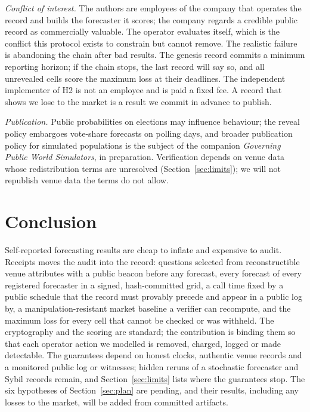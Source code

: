 \documentclass[11pt]{article}
\begin{document}
\emph{Conflict of interest.} The authors are employees of the company that operates the record and builds the forecaster it scores; the company regards a credible public record as commercially valuable. The operator evaluates itself, which is the conflict this protocol exists to constrain but cannot remove. The realistic failure is abandoning the chain after bad results. The genesis record commits a minimum reporting horizon; if the chain stops, the last record will say so, and all unrevealed cells score the maximum loss at their deadlines. The independent implementer of H2 is not an employee and is paid a fixed fee. A record that shows we lose to the market is a result we commit in advance to publish.

\emph{Publication.} Public probabilities on elections may influence behaviour; the reveal policy embargoes vote-share forecasts on polling days, and broader publication policy for simulated populations is the subject of the companion \emph{Governing Public World Simulators}, in preparation. Verification depends on venue data whose redistribution terms are unresolved (Section~\ref{sec:limits}); we will not republish venue data the terms do not allow.

\section{Conclusion}

Self-reported forecasting results are cheap to inflate and expensive to audit. Receipts moves the audit into the record: questions selected from reconstructible venue attributes with a public beacon before any forecast, every forecast of every registered forecaster in a signed, hash-committed grid, a call time fixed by a public schedule that the record must provably precede and appear in a public log by, a manipulation-resistant market baseline a verifier can recompute, and the maximum loss for every cell that cannot be checked or was withheld. The cryptography and the scoring are standard; the contribution is binding them so that each operator action we modelled is removed, charged, logged or made detectable. The guarantees depend on honest clocks, authentic venue records and a monitored public log or witnesses; hidden reruns of a stochastic forecaster and Sybil records remain, and Section~\ref{sec:limits} lists where the guarantees stop. The six hypotheses of Section~\ref{sec:plan} are pending, and their results, including any losses to the market, will be added from committed artifacts.



\end{document}
